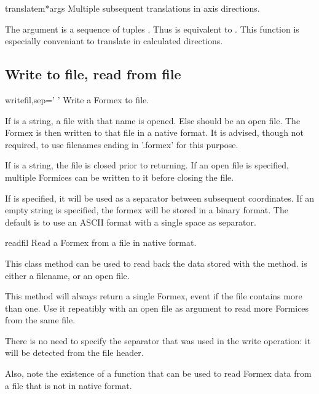 {{\begin{methoddesc}{translatem}{*args}
Multiple subsequent translations in axis directions.

The argument  is a sequence of tuples . Thus  is equivalent to . This function is especially conveniant to translate in calculated directions.
\end{methoddesc}


\subsection{Write to file, read from file}


\begin{methoddesc}{write}{fil,sep=' '}
Write a Formex to file.

If  is a string, a file with that name is opened. Else  should
be an open file.
The Formex is then written to that file in a native format. It is advised, though not required, to use filenames ending in '.formex' for this purpose.

If  is a string, the file is closed prior to returning. If an open file is specified, multiple Formices can be written to it before closing the file.

If  is specified, it will be used as a separator between subsequent coordinates. If an empty string is specified, the formex will be stored in a binary format. The default is to use an ASCII format with a single space as separator.
\end{methoddesc}


\begin{methoddesc}{read}{fil}
Read a Formex from a file in native format. 

This class method can be used to read back the data stored with the  method.  is either a filename, or an open file.
 
This method will always return a single Formex, event if the file contains more than one. Use it repeatibly with an open file as argument to read more Formices from the same file.

There is no need to specify the separator that was used in the write operation: it will be detected from the file header.

Also, note the existence of a  function that can be used to read Formex data from a file that is not in native format. 


\end{methoddesc}}}
